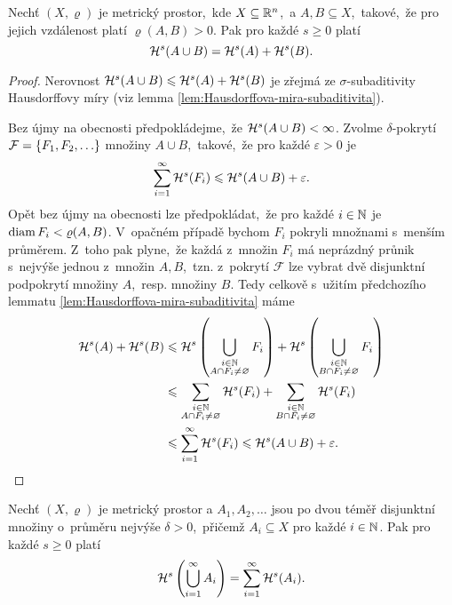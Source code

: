 \begin{lemma}\label{lem:hausdorffova-mira-sigma-aditivita-kladna-vzdalenost}
    Nechť $(X,\varrho)$ je metrický prostor,~kde $X\subseteq\mathbb{R}^n$,~a $A,B\subseteq X$,~takové,~že pro jejich vzdálenost platí $\varrho(A,B)>0$. Pak pro každé $s\geqslant 0$ platí
    \[\mathcal{H}^{s}(A\cup B)=\mathcal{H}^{s}(A)+\mathcal{H}^{s}(B).\]
\end{lemma}
\begin{proof}
    Nerovnost $\mathcal{H}^{s}(A\cup B)\leqslant\mathcal{H}^{s}(A)+\mathcal{H}^{s}(B)$ je zřejmá ze $\sigma$-subaditivity Hausdorffovy míry (viz lemma \ref{lem:Hausdorffova-mira-subaditivita}).

    Bez újmy na obecnosti předpokládejme,~že $\mathcal{H}^{s}(A\cup B)<\infty$. Zvolme $\delta$-pokrytí $\mathcal{F}=\left\{F_1,F_2,\ldots\right\}$ množiny $A\cup B$,~takové,~že pro každé $\varepsilon>0$ je
    \[\sum_{i=1}^{\infty}\mathcal{H}^{s}(F_i)\leqslant\mathcal{H}^{s}(A\cup B)+\varepsilon.\]
    Opět bez újmy na obecnosti lze předpokládat,~že pro každé $i\in\mathbb{N}$ je $\operatorname{diam}{F_i}<\varrho(A,B)$. V~opačném případě bychom $F_i$ pokryli množnami s~menším průměrem. Z~toho pak plyne,~že každá z~množin $F_i$ má neprázdný průnik s~nejvýše jednou z~množin $A,B$,~tzn. z~pokrytí $\mathcal{F}$ lze vybrat dvě disjunktní podpokrytí množiny $A$,~resp. množiny $B$. Tedy celkově s~užitím předchozího lemmatu \ref{lem:Hausdorffova-mira-subaditivita} máme
    \begin{align*}
        \mathcal{H}^{s}(A)+\mathcal{H}^{s}(B)&\leqslant\mathcal{H}^{s}\left(\bigcup_{\substack{i\in\mathbb{N}\\ A\cap F_i\neq\varnothing}}F_i\right)+\mathcal{H}^{s}\left(\bigcup_{\substack{i\in\mathbb{N}\\ B\cap F_i\neq\varnothing}}F_i\right)\\
        &\leqslant\sum_{\substack{i\in\mathbb{N}\\ A\cap F_i\neq\varnothing}}\mathcal{H}^{s}(F_i)+\sum_{\substack{i\in\mathbb{N}\\ B\cap F_i\neq\varnothing}}\mathcal{H}^{s}(F_i)\\
        &\leqslant\sum_{i=1}^{\infty}\mathcal{H}^{s}(F_i)\leqslant\mathcal{H}^{s}(A\cup B)+\varepsilon.
    \end{align*}
\end{proof}
\begin{lemma}\label{lem:hausdorffova-mira-sigma-aditivita-temer-disjunktni}
    Nechť $(X,\varrho)$ je metrický prostor a $A_1,A_2,\ldots$ jsou po dvou téměř disjunktní množiny o~průměru nejvýše $\delta>0$,~přičemž $A_i\subseteq X$ pro každé $i\in\mathbb{N}$. Pak pro každé $s\geqslant 0$ platí
    \[\mathcal{H}^{s}\left(\bigcup_{i=1}^\infty A_i\right)=\sum_{i=1}^{\infty}\mathcal{H}^{s}(A_i).\]
\end{lemma}
